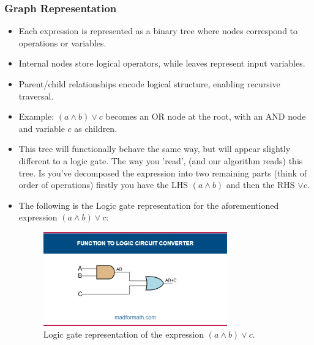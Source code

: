 \documentclass[11pt]{diazessay} %
\begin{document}
\subsubsection*{Graph Representation}
\begin{itemize}
    \item Each expression is represented as a binary tree where nodes correspond 
    to operations or variables.
    \item Internal nodes store logical operators, while leaves represent input variables.
    \item Parent/child relationships encode logical structure, enabling recursive traversal.
    \item Example: $(a \wedge b) \vee c$ becomes an OR node at the root, with an 
    AND node and variable $c$ as children.
	
\begin{center} %
\end{center}
	\item This tree will functionally behave the same way, but will appear slightly different to a logic gate. The way you 'read', (and our algorithm reads) this tree. Is you've decomposed the expression into two remaining parts (think of order of operations) firstly you have the LHS $(a \wedge b)$ and then the RHS $\vee c$.
	\item The following is the Logic gate representation for the aforementioned expression $(a \wedge b) \vee c$:
	\begin{figure}[h] %
    \centering
    \includegraphics[width=0.75\textwidth]{LogicGate}
    \caption{Logic gate representation of the expression $(a \wedge b) \vee c$.}
    \label{fig:logic_gate}
\end{figure}



\end{itemize}
\end{document}
